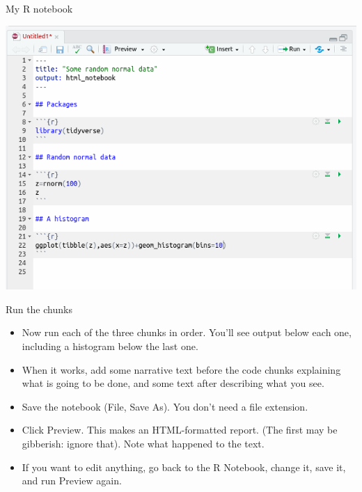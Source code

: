 \documentclass[
  ignorenonframetext,
]{beamer}
\providecommand{\tightlist}{%
  \setlength{\itemsep}{0pt}\setlength{\parskip}{0pt}}
\begin{document}
\begin{frame}{My R notebook}
\protect\hypertarget{my-r-notebook}{}

\includegraphics{Screenshot_2018-06-29_17-04-43.png}

\end{frame}

\begin{frame}{Run the chunks}
\protect\hypertarget{run-the-chunks}{}

\begin{itemize}
\tightlist
\item
  Now run each of the three chunks in order. You'll see output below
  each one, including a histogram below the last one.
\item
  When it works, add some narrative text before the code chunks
  explaining what is going to be done, and some text after describing
  what you see.
\item
  Save the notebook (File, Save As). You don't need a file extension.
\item
  Click Preview. This makes an HTML-formatted report. (The first may be
  gibberish: ignore that). Note what happened to the text.
\item
  If you want to edit anything, go back to the R Notebook, change it,
  save it, and run Preview again.
\end{itemize}

\end{frame}
\end{document}
